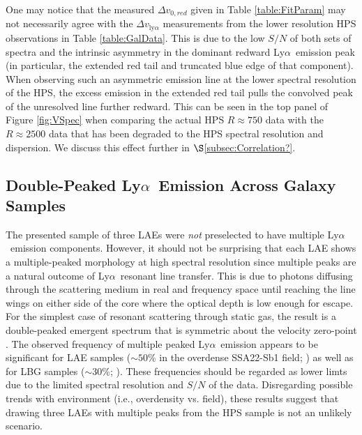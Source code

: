 \documentclass{emulateapj}
\newcommand{\lya}{Ly$\alpha$}
\begin{document}
One may notice that the measured $\Delta v_{0,red}$ given in Table \ref{table:FitParam} may not necessarily agree with the $\Delta v_{\mathrm{ly}\alpha}$ measurements from the lower resolution HPS observations in Table \ref{table:GalData}. This is due to the low $S/N$ of both sets of spectra and the intrinsic asymmetry in the dominant redward \lya\ emission peak (in particular, the extended red tail and truncated blue edge of that component). When observing such an asymmetric emission line at the lower spectral resolution of the HPS, the excess emission in the extended red tail pulls the convolved peak of the unresolved line further redward. This can be seen in the top panel of Figure \ref{fig:VSpec} when comparing the actual HPS $R\approx750$ data with the $R\approx2500$ data that has been degraded to the HPS spectral resolution and dispersion. We discuss this effect further in $\S$\ref{subsec:Correlation?}.

\subsection{Double-Peaked \lya\ Emission Across Galaxy Samples}\label{subsec:Comparison}
The presented sample of three LAEs were \textit{not} preselected to have multiple \lya\ emission components. However, it should not be surprising that each LAE shows a multiple-peaked morphology at high spectral resolution since multiple peaks are a natural outcome of \lya\ resonant line transfer. This is due to photons diffusing through the scattering medium in real and frequency space until reaching the line wings on either side of the core where the optical depth is low enough for escape. For the simplest case of resonant scattering through static gas, the result is a double-peaked emergent spectrum that is symmetric about the velocity zero-point \citep{neufeld1990}. The observed frequency of multiple peaked \lya\ emission appears to be significant for LAE samples ($\sim50$\% in the overdense SSA22-Sb1 field; \citealp{yamada2012}) as well as for LBG samples ($\sim30$\%; \citealp{kulas2012}). These frequencies should be regarded as lower limts due to the limited spectral resolution and $S/N$ of the data. Disregarding possible trends with environment (i.e., overdensity vs. field), these results suggest that drawing three LAEs with multiple peaks from the HPS sample is not an unlikely scenario. 
\end{document}
